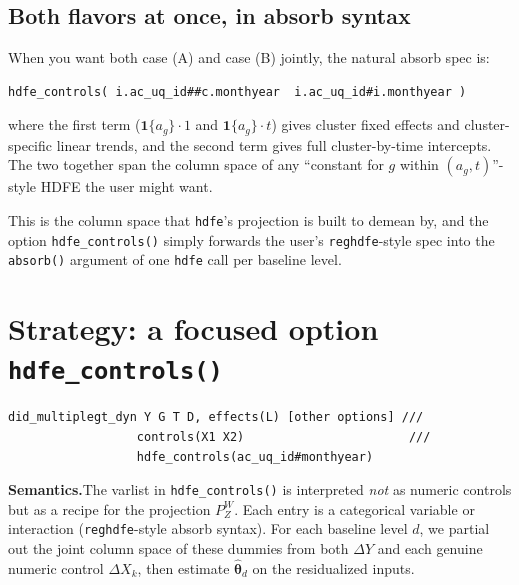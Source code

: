 \documentclass[11pt]{article}
\newcommand{\code}[1]{\texttt{\small #1}}
\newcommand{\1}{\mathbb{1}}
\newcommand{\thetad}{\widehat{\bm{\theta}}_d}
\newcommand{\Pproj}{P^{\!W}}
\begin{document}
\subsection*{Both flavors at once, in absorb syntax}

When you want both case (A) and case (B) jointly, the natural absorb
spec is:
\begin{lstlisting}
hdfe_controls( i.ac_uq_id##c.monthyear  i.ac_uq_id#i.monthyear )
\end{lstlisting}
where the first term ($\mathbf{1}\{a_g\}\!\cdot\!1$ and
$\mathbf{1}\{a_g\}\!\cdot\!t$) gives cluster fixed effects and
cluster-specific linear trends, and the second term gives full
cluster-by-time intercepts. The two together span the column space of any
``constant for $g$ within $(a_g, t)$''-style HDFE the user might want.

\medskip
\noindent
This is the column space that \code{hdfe}'s projection is built to demean
by, and the option \code{hdfe\_controls()} simply forwards the user's
\code{reghdfe}-style spec into the \code{absorb()} argument of one
\code{hdfe} call per baseline level.

\section{Strategy: a focused option \code{hdfe\_controls()}}

\begin{lstlisting}
did_multiplegt_dyn Y G T D, effects(L) [other options] ///
                  controls(X1 X2)                       ///
                  hdfe_controls(ac_uq_id#monthyear)
\end{lstlisting}

\noindent
\textbf{Semantics.}\;The varlist in \code{hdfe\_controls()} is interpreted
\emph{not} as numeric controls but as a recipe for the projection
$\Pproj_Z$. Each entry is a categorical variable or interaction
(\texttt{reghdfe}-style absorb syntax). For each baseline level $d$, we
partial out the joint column space of these dummies from both $\Delta Y$ and
each genuine numeric control $\Delta X_k$, then estimate $\thetad$ on the
residualized inputs.
\end{document}
